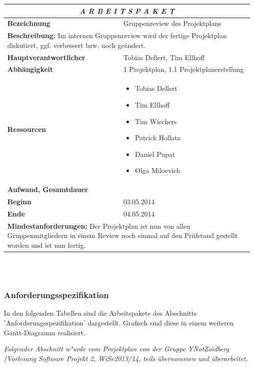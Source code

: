 \documentclass[fontsize=12pt,paper=a4,twoside]{scrartcl}
\begin{document}
\begin{tabular}{p{7.5cm}|p{7.5cm}}\toprule
\multicolumn{2}{c}{\textbf{\textit{A R B E I T S P A K E T \quad 1.2}}} \\ \toprule \hline
\textbf{Bezeichnung} & Gruppenreview des Projektplans\\\hline
\multicolumn{2}{p{15cm}}{\textbf{Beschreibung:} \newline 
Im internen Gruppenreview wird der fertige Projektplan diskutiert, ggf. verbessert bzw. noch geändert.}  \\\hline
\textbf{Hauptverantwortlicher} & Tobias Dellert, Tim Ellhoff \\\hline
\textbf{Abhängigkeit} & 1 Projektplan, 1.1 Projektplanerstellung\\\hline
\textbf{Ressourcen} & \begin{itemize}
\itemsep0pt
\item Tobias Dellert
\item Tim Ellhoff
\item Tim Wiechers
\item Patrick Hollatz
\item Daniel Pupat
\item Olga Miloevich
\end{itemize} \\\hline
\textbf{Aufwand, Gesamtdauer} & \\\hline
\textbf{Beginn} & 03.05.2014 \\\hline
\textbf{Ende} & 04.05.2014\\\hline
\multicolumn{2}{p{15cm}}{\textbf{Mindestanforderungen: } \newline
Der Projektplan ist nun von allen Gruppenmitgliedern in einem Review noch einmal auf den Prüfstand gestellt worden und ist nun fertig. }  \\ \toprule
\end{tabular} \\\\

\subsubsection{Anforderungsspezifikation}\label{aps}

In den folgenden Tabellen sind die Arbeitspakete des Abschnitts 'Anforderungsspezifikation' dargestellt. Grafisch sind diese in einem weiteren Gantt-Diagramm realisiert.

\textit{Folgender Abschnitt w"urde vom Projektplan von der Gruppe YNotZoidberg (Vorlesung Software Projekt 2, WiSe2013/14, teils übernommen und überarbeitet.}
\end{document}
